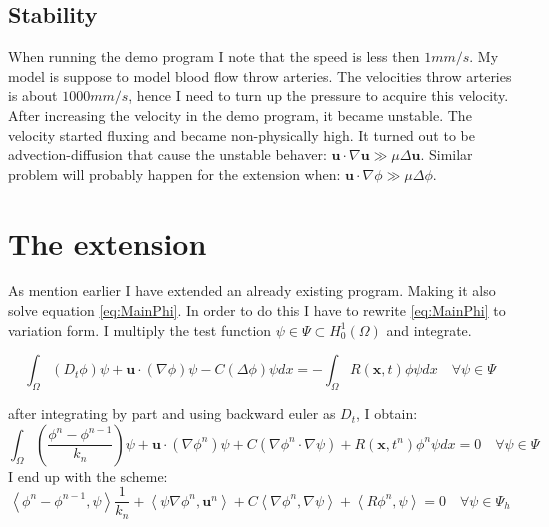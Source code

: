 \documentclass[12pt,a4paper,english]{article}
\begin{document}
\subsection*{Stability}
When running the demo program I note that the speed is less then $1 mm/s$. My model is suppose to model blood flow throw arteries. The velocities throw arteries is about $1000 mm/s$, hence I need to turn up the pressure to acquire this velocity. \\
After increasing the velocity in the demo program, it became unstable. The velocity started fluxing and became non-physically high. It turned out to be advection-diffusion that cause the unstable behaver: $\textbf{u} \cdot \nabla \textbf{u} \gg \mu \Delta \textbf{u}$. Similar problem will probably happen for the extension when: $\textbf{u} \cdot \nabla \phi \gg \mu \Delta \phi$.  

\section*{The extension}
As mention earlier I have extended an already existing program. Making it also solve equation \ref{eq:MainPhi}. In order to do this I have to rewrite \ref{eq:MainPhi} to variation form. I multiply the test function $\psi \in \Psi \subset H^{1}_{0}\left( \Omega \right)$ and integrate.


$$
\int_{\Omega} \left( D_t \phi \right)\psi + \textbf{u}\cdot\left( \nabla \phi \right)\psi - C\left( \Delta\phi\right) \psi dx = - \int_{\Omega} R(\textbf{x}, t) \phi\psi dx \quad \forall \psi \in \Psi
$$


after integrating by part and using backward euler as $D_t$, I obtain:
$$
\int_{\Omega} \left( \frac{\phi^n - \phi^{n-1}}{k_n}\right) \psi + \textbf{u}\cdot\left( \nabla \phi^n \right)\psi + C\left( \nabla\phi^n \cdot \nabla \psi \right) + R\left( \textbf{x}, t^n \right) \phi^n \psi dx = 0 \quad \forall \psi \in \Psi
$$
I end up with the scheme:
\begin{equation}
\left\langle \phi^n -\phi^{n-1}, \psi \right\rangle \frac{1}{k_n} + \left\langle \psi \nabla \phi^n, \textbf{u}^n\right\rangle + C\left\langle \nabla \phi^n, \nabla \psi \right\rangle + \left\langle R\phi^n , \psi \right\rangle = 0 \quad \forall \psi \in \Psi_h
\label{eq:discretephi}
\end{equation}



%


\end{document}
